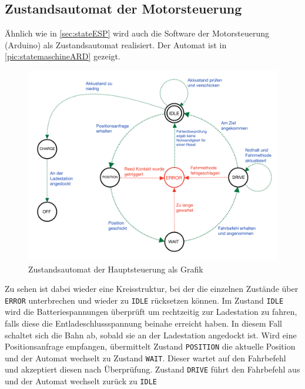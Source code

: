 \subsection{Zustandsautomat der Motorsteuerung}
\label{sec:stateARD}
Ähnlich wie in \autoref{sec:stateESP} wird auch die Software der Motorsteuerung (Arduino) als Zustandsautomat realisiert. 
Der Automat ist in \autoref{pic:statemaschineARD} gezeigt.

\begin{figure}[h]
	\begin{center}
		\includegraphics[width=16cm]{stateMaschineARD.pdf}
		\caption{\label{pic:statemaschineARD}Zustandsautomat der Hauptsteuerung als Grafik}
	\end{center}
\end{figure}

Zu sehen ist dabei wieder eine Kreisstruktur, bei der die einzelnen Zustände über \texttt{ERROR} unterbrechen und wieder zu \texttt{IDLE} rücksetzen können. Im Zustand \texttt{IDLE} wird die Batteriespannungen überprüft um rechtzeitig zur Ladestation zu fahren, falls diese die Entladeschlussspannung beinahe erreicht haben. In diesem Fall schaltet sich die Bahn ab, sobald sie an der Ladestation angedockt ist. Wird eine Positionsanfrage empfangen, übermittelt Zustand \texttt{POSITION} die aktuelle Position und der Automat wechselt zu Zustand \texttt{WAIT}. Dieser wartet auf den Fahrbefehl und akzeptiert diesen nach Überprüfung. Zustand \texttt{DRIVE} führt den Fahrbefehl aus und der Automat wechselt zurück zu \texttt{IDLE}

